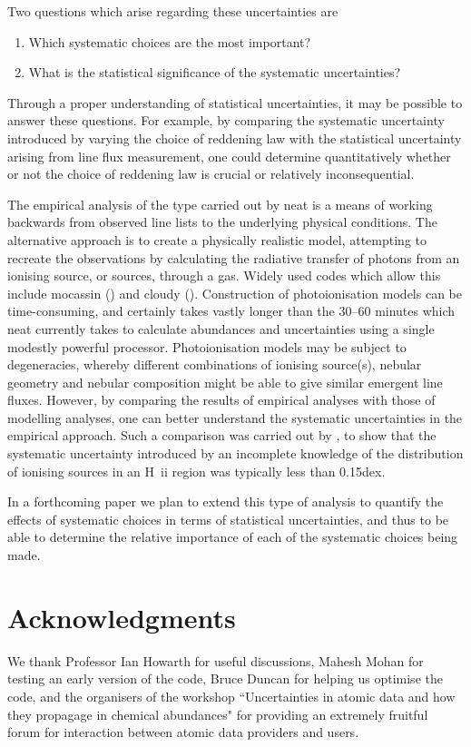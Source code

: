 \documentclass[useAMS,usenatbib]{mn2e}
\begin{document}
Two questions which arise regarding these uncertainties are

\begin{enumerate}
\item Which systematic choices are the most important?
\item What is the statistical significance of the systematic uncertainties?
\end{enumerate}

Through a proper understanding of statistical uncertainties, it may be possible to answer these questions.  For example, by comparing the systematic uncertainty introduced by varying the choice of reddening law with the statistical uncertainty arising from line flux measurement, one could determine quantitatively whether or not the choice of reddening law is crucial or relatively inconsequential.

The empirical analysis of the type carried out by {\sc neat} is a means of working backwards from observed line lists to the underlying physical conditions.  The alternative approach is to create a physically realistic model, attempting to recreate the observations by calculating the radiative transfer of photons from an ionising source, or sources, through a gas.  Widely used codes which allow this include {\sc mocassin} (\citep{2003MNRAS.340.1136E}) and {\sc cloudy} (\citep{1998PASP..110..761F}).  Construction of photoionisation models can be time-consuming, and certainly takes vastly longer than the 30--60 minutes which {\sc neat} currently takes to calculate abundances and uncertainties using a single modestly powerful processor.  Photoionisation models may be subject to degeneracies, whereby different combinations of ionising source(s), nebular geometry and nebular composition might be able to give similar emergent line fluxes.  However, by comparing the results of empirical analyses with those of modelling analyses, one can better understand the systematic uncertainties in the empirical approach.  Such a comparison was carried out by \citet{2010MNRAS.401.1375E}, to show that the systematic uncertainty introduced by an incomplete knowledge of the distribution of ionising sources in an H~{\sc ii} region was typically less than 0.15dex.

In a forthcoming paper we plan to extend this type of analysis to quantify the effects of systematic choices in terms of statistical uncertainties, and thus to be able to determine the relative importance of each of the systematic choices being made.

\section*{Acknowledgments}

We thank Professor Ian Howarth for useful discussions, Mahesh Mohan for testing an early version of the code, Bruce Duncan for helping us optimise the code, and the organisers of the workshop ``Uncertainties in atomic data and how they propagage in chemical abundances" for providing an extremely fruitful forum for interaction between atomic data providers and users.





\label{lastpage}
\end{document}

